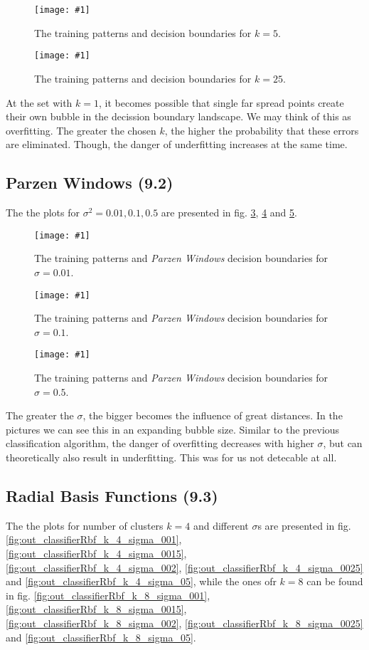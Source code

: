 \documentclass[a4paper,headings=small]{scrartcl}
\newcommand{\image}[3]{
\begin{figure}[htbp]
\centering
\texttt{[image: \#1]}
\caption{#3}
\label{fig:#1}
\end{figure}
}
\begin{document}
\image{out_classifierKnn_k_5}{\classifierPlotWidth}%
	{The training patterns and decision boundaries for $k = 5$.}

\image{out_classifierKnn_k_25}{\classifierPlotWidth}%
	{The training patterns and decision boundaries for $k = 25$.}

At the set with $k = 1$, it becomes possible that single far spread points
create their own bubble in the decission boundary landscape.
We may think of this as overfitting.
The greater the chosen $k$, the higher the probability that these errors are eliminated.
Though, the danger of underfitting increases at the same time.


\subsection{Parzen Windows (9.2)}
The the plots for $\sigma^2 = 0.01, 0.1, 0.5$ are presented in fig.
\ref{fig:out_classifierParzen_sigma2_001},
\ref{fig:out_classifierParzen_sigma2_01} and
\ref{fig:out_classifierParzen_sigma2_05}.

\image{out_classifierParzen_sigma2_001}{\classifierPlotWidth}%
	{The training patterns and \emph{Parzen Windows} decision boundaries for $\sigma = 0.01$.}

\image{out_classifierParzen_sigma2_01}{\classifierPlotWidth}%
	{The training patterns and \emph{Parzen Windows} decision boundaries for $\sigma = 0.1$.}

\image{out_classifierParzen_sigma2_05}{\classifierPlotWidth}%
	{The training patterns and \emph{Parzen Windows} decision boundaries for $\sigma = 0.5$.}

The greater the $\sigma$, the bigger becomes the influence of great distances.
In the pictures we can see this in an expanding bubble size.
Similar to the previous classification algorithm, the danger of overfitting decreases with higher $\sigma$,
but can theoretically also result in underfitting.
This was for us not detecable at all.


\subsection{Radial Basis Functions (9.3)}
The the plots for number of clusters $k = 4$ and different $\sigma$s are presented in fig.
\ref{fig:out_classifierRbf_k_4_sigma_001},
\ref{fig:out_classifierRbf_k_4_sigma_0015},
\ref{fig:out_classifierRbf_k_4_sigma_002},
\ref{fig:out_classifierRbf_k_4_sigma_0025} and
\ref{fig:out_classifierRbf_k_4_sigma_05},
while the ones ofr $k = 8$ can be found in fig.
\ref{fig:out_classifierRbf_k_8_sigma_001},
\ref{fig:out_classifierRbf_k_8_sigma_0015},
\ref{fig:out_classifierRbf_k_8_sigma_002},
\ref{fig:out_classifierRbf_k_8_sigma_0025} and
\ref{fig:out_classifierRbf_k_8_sigma_05}.
\end{document}

